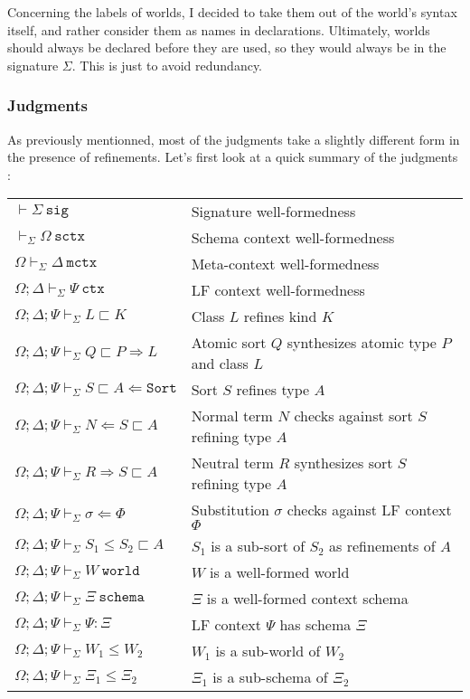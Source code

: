 \documentclass[letterpaper, 11pt]{article}
\newcommand{\Rar}{\Rightarrow}
\newcommand{\Lar}{\Leftarrow}
\newcommand{\Sort}{\texttt{Sort}}
\newcommand{\world}{\texttt{world}}
\newcommand{\schema}{\texttt{schema}}
\newcommand{\ctx}{\texttt{ctx}}
\newcommand{\mctx}{\texttt{mctx}}
\newcommand{\sctx}{\texttt{sctx}}
\newcommand{\sig}{\texttt{sig}}
\begin{document}
    Concerning the labels of worlds, I decided to take them out of the world's syntax itself, and rather consider them as names in declarations.  
    Ultimately, worlds should always be declared before they are used, so they would always be in the signature $\Sigma$.  This is just to avoid redundancy.

    \subsubsection{Judgments}
    As previously mentionned, most of the judgments take a slightly different form in the presence of refinements.  Let's first look at a 
    quick summary of the judgments :

    \begin{tabular}{ll}
        $ \vdash \Sigma \ \sig $                                       & Signature well-formedness \\
        $ \vdash_\Sigma \Omega \ \sctx$                                 & Schema context well-formedness \\
        $ \Omega \vdash_\Sigma \Delta \ \mctx $                         & Meta-context well-formedness \\
        $ \Omega; \Delta \vdash_\Sigma \Psi \ \ctx $                    & LF context well-formedness \\
        $ \Omega; \Delta; \Psi \vdash_\Sigma L \sqsubset K $            & Class $L$ refines kind $K$ \\
        $ \Omega; \Delta; \Psi \vdash_\Sigma Q \sqsubset P \Rar L $     & Atomic sort $Q$ synthesizes atomic type $P$ and class $L$ \\
        $ \Omega; \Delta; \Psi \vdash_\Sigma S \sqsubset A \Lar \Sort $ & Sort $S$ refines type $A$ \\
        $ \Omega; \Delta; \Psi \vdash_\Sigma N \Lar S \sqsubset A $     & Normal term $N$ checks against sort $S$ refining type $A$ \\
        $ \Omega; \Delta; \Psi \vdash_\Sigma R \Rar S \sqsubset A $     & Neutral term $R$ synthesizes sort $S$ refining type $A$ \\
        $ \Omega; \Delta; \Psi \vdash_\Sigma \sigma \Lar \Phi $         & Substitution $\sigma$ checks against LF context $\Phi$ \\
        $ \Omega; \Delta; \Psi \vdash_\Sigma S_1 \leq S_2 \sqsubset A $ & $S_1$ is a sub-sort of $S_2$ as refinements of $A$ \\
        $ \Omega; \Delta; \Psi \vdash_\Sigma W \ \world $               & $W$ is a well-formed world \\
        $ \Omega; \Delta; \Psi \vdash_\Sigma \Xi \ \schema $            & $\Xi$ is a well-formed context schema \\
        $ \Omega; \Delta; \Psi \vdash_\Sigma \Psi : \Xi $               & LF context $\Psi$ has schema $\Xi$ \\
        $ \Omega; \Delta; \Psi \vdash_\Sigma W_1 \leq W_2 $             & $W_1$ is a sub-world of $W_2$\\
        $ \Omega; \Delta; \Psi \vdash_\Sigma \Xi_1 \leq \Xi_2 $         & $\Xi_1$ is a sub-schema of $\Xi_2$
    \end{tabular}
\end{document}
